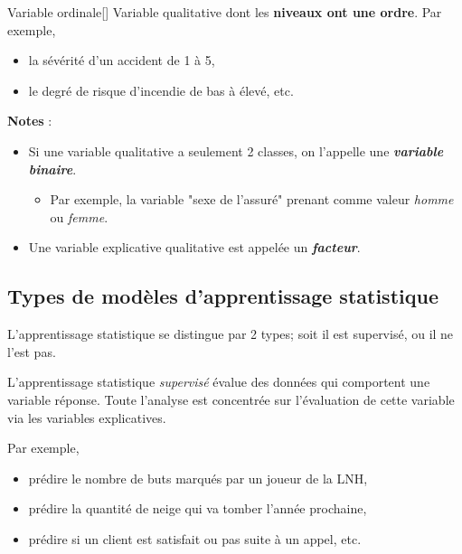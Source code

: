 \documentclass[french]{article}
\begin{document}
\begin{multicols*}{2}
\begin{definitionNOHFILLsub}
\begin{definitionGENERAL}{\hypertarget{ordinalVariable}{Variable ordinale}}[]
Variable qualitative dont les \textbf{niveaux ont une ordre}. Par exemple, 
\begin{itemize}
	\item	la sévérité d'un accident de 1 à 5,
	\item	le degré de risque d'incendie de bas à élevé, etc.
\end{itemize}
\end{definitionGENERAL}

\bigskip

\textbf{Notes} :
\begin{itemize}
	\item	Si une variable qualitative a seulement 2 classes, on l'appelle une \textbf{\textit{variable binaire}}.
		\begin{itemize}
		\item	Par exemple, la variable "sexe de l'assuré" prenant comme valeur \textit{homme} ou \textit{femme}.
		\end{itemize}
	\item	Une variable explicative qualitative est appelée un \textit{\textbf{facteur}}.
\end{itemize}
\end{definitionNOHFILLsub}



\columnbreak
\subsection{Types de modèles d'apprentissage statistique}
L'apprentissage statistique se distingue par 2 types; soit il est supervisé, ou il ne l'est pas.

\begin{definitionNOHFILLsub}
L'apprentissage statistique \textit{supervisé} évalue des données qui comportent une variable réponse. Toute l'analyse est concentrée sur l'évaluation de cette variable via les variables explicatives. 

\bigskip

Par exemple, 
\begin{itemize}
	\item	prédire le nombre de buts marqués par un joueur de la LNH,
	\item	prédire la quantité de neige qui va tomber l'année prochaine,
	\item	prédire si un client est satisfait ou pas suite à un appel, etc.
\end{itemize}
\end{definitionNOHFILLsub}


\end{multicols*}
\end{document}
